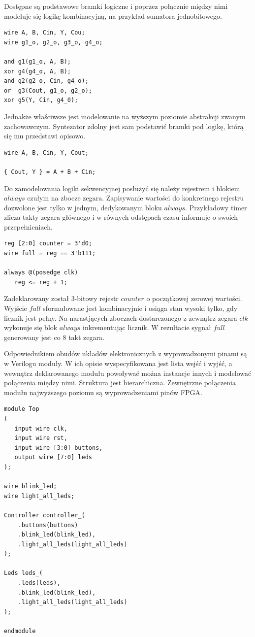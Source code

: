\documentclass[a4paper,12pt]{article}
\begin{document}
Dostępne są podstawowe bramki logiczne i poprzez połącznie między nimi modeluje się logikę kombinacyjną, na przykład sumatora jednobitowego.
\begin{lstlisting}[label=Sum1,caption=Sum1.v]
wire A, B, Cin, Y, Cou;
wire g1_o, g2_o, g3_o, g4_o;

and g1(g1_o, A, B);
xor g4(g4_o, A, B);
and g2(g2_o, Cin, g4_o);
or  g3(Cout, g1_o, g2_o);
xor g5(Y, Cin, g4_0);
\end{lstlisting}

Jednakże właściwsze jest modelowanie na wyższym poziomie abstrakcji zwanym zachowawczym. Syntezator zdolny jest sam podstawić bramki pod logikę, którą się mu przedstawi opisowo.

\begin{lstlisting}[label=Sum1,caption=Sum1.v]
wire A, B, Cin, Y, Cout;

{ Cout, Y } = A + B + Cin;
\end{lstlisting}

Do zamodelowania logiki sekwencyjnej posłużyć się należy rejestrem i blokiem $always$ czułym na zbocze zegara. Zapisywanie wartości do konkretnego rejestru dozwolone jest tylko w jednym, dedykowanym bloku $always$. Przykładowy timer zlicza takty zegara głównego i w równych odstępach czasu informuje o swoich przepełnieniach.
\begin{lstlisting}[label=Timer,caption=Timer.v]
reg [2:0] counter = 3'd0;
wire full = reg == 3'b111;

always @(posedge clk)
   reg <= reg + 1;
\end{lstlisting}

Zadeklarowany został 3-bitowy rejestr $counter$ o początkowej zerowej wartości. Wyjście $full$ sformułowane jest kombinacyjnie i osiąga stan wysoki tylko, gdy licznik jest pełny. Na narastjących zboczach dostarczonego z zewnątrz zegara $clk$ wykonuje się blok $always$ inkrementując licznik. W rezultacie sygnał $full$ generowany jest co 8 takt zegara.

Odpowiednikiem obudów układów elektronicznych z wyprowadzonymi pinami są w Verilogu moduły. W ich opisie wyspecyfikowana jest lista wejść i wyjść, a wewnątrz deklarowanego modułu powoływać można instancje innych i modelować połączenia między nimi. Struktura jest hierarchiczna. Zewnętrzne połączenia modułu najwyższego poziomu są wyprowadzeniami pinów FPGA.
\begin{lstlisting}[label=Top,caption=Top.v]
module Top
(
   input wire clk,
   input wire rst,
   input wire [3:0] buttons,
   output wire [7:0] leds
);

wire blink_led;
wire light_all_leds;

Controller controller_(
    .buttons(buttons)
    .blink_led(blink_led),
    .light_all_leds(light_all_leds)
);

Leds leds_(
    .leds(leds),
    .blink_led(blink_led),
    .light_all_leds(light_all_leds)
);

endmodule
\end{lstlisting}
\end{document}
